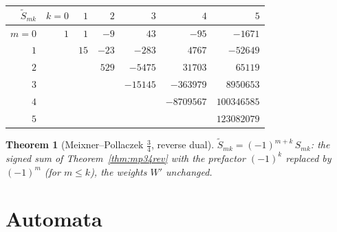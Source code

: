 \documentclass[11pt,a4paper]{article}
\newtheorem{theorem}{Theorem}[section]
\theoremstyle{definition}
\begin{document}
\begin{tcolorbox}[colback=black!5, colframe=black!5, boxrule=0pt, sharp corners]
\begin{center}
\begin{tabular}{r|rrrrrr}
$\widetilde S_{mk}$ & $k=0$ & $1$ & $2$ & $3$ & $4$ & $5$ \\
\hline
$m=0$ & $1$ & $1$ & $-9$ & $43$ & $-95$ & $-1671$ \\
$1$ &  & $15$ & $-23$ & $-283$ & $4767$ & $-52649$ \\
$2$ &  &  & $529$ & $-5475$ & $31703$ & $65119$ \\
$3$ &  &  &  & $-15145$ & $-363979$ & $8950653$ \\
$4$ &  &  &  &  & $-8709567$ & $100346585$ \\
$5$ &  &  &  &  &  & $123082079$ \\
\end{tabular}
\end{center}
\end{tcolorbox}

\begin{tcolorbox}[colback=blue!5, colframe=blue!5, boxrule=0pt, sharp corners]
\begin{theorem}[Meixner--Pollaczek $\tfrac34$, reverse dual]
\label{thm:mp34dual}
$\widetilde S_{mk} = (-1)^{m+k}\, S_{mk}$: the signed sum of
Theorem~\ref{thm:mp34rev} with the prefactor $(-1)^k$ replaced by
$(-1)^m$ (for $m \le k$), the weights $W'$ unchanged.
\end{theorem}
\end{tcolorbox}

\newpage
\section{Automata}
\end{document}
